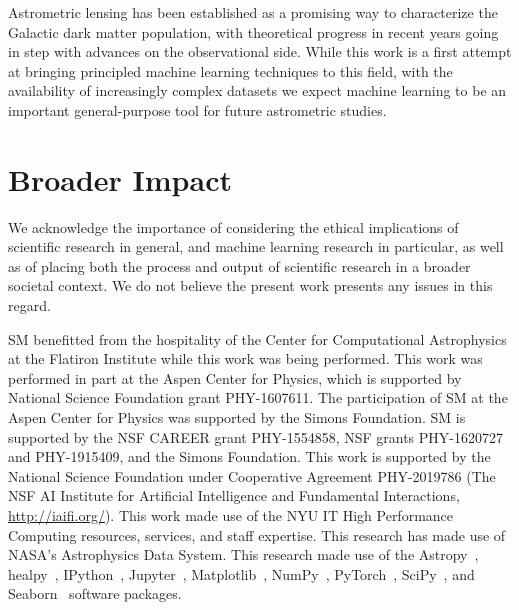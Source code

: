 \documentclass[]{article}
\begin{document}
Astrometric lensing has been established as a promising way to characterize the Galactic dark matter population, with theoretical progress in recent years going in step with advances on the observational side. While this work is a first attempt at bringing principled machine learning techniques to this field, with the availability of increasingly complex datasets we expect machine learning to be an important general-purpose tool for future astrometric studies.


\section*{Broader Impact}
\label{sec:impact}

We acknowledge the importance of considering the ethical implications of scientific research in general, and machine learning research in particular, as well as of placing both the process and output of scientific research in a broader societal context. We do not believe the present work presents any issues in this regard. 

\begin{ack}
SM benefitted from the hospitality of the Center for Computational Astrophysics at the Flatiron Institute while this work was being performed. 
This work was performed in part at the Aspen Center for Physics, which is supported by National Science Foundation grant PHY-1607611.
The participation of SM at the Aspen Center for Physics was supported by the Simons Foundation.
SM is supported by the NSF CAREER grant PHY-1554858, NSF grants PHY-1620727 and PHY-1915409, and the Simons Foundation. 
This work is supported by the National Science Foundation under Cooperative Agreement PHY-2019786 (The NSF AI Institute for Artificial Intelligence and Fundamental Interactions, \url{http://iaifi.org/}).
This work made use of the NYU IT High Performance Computing resources, services, and staff expertise. 
This research has made use of NASA's Astrophysics Data System. 
This research made use of the Astropy~\cite{Robitaille:2013mpa,Price-Whelan:2018hus},
healpy~\cite{Gorski:2004by,Zonca2019},
IPython~\cite{PER-GRA:2007},
Jupyter~\cite{Kluyver2016JupyterN},
Matplotlib~\cite{Hunter:2007},
NumPy~\cite{harris_array_2020},
PyTorch~\cite{NEURIPS2019_9015},
SciPy~\cite{2020SciPy-NMeth}, and
Seaborn~\cite{michael_waskom_2017_883859}
software packages.
\end{ack}
\end{document}
